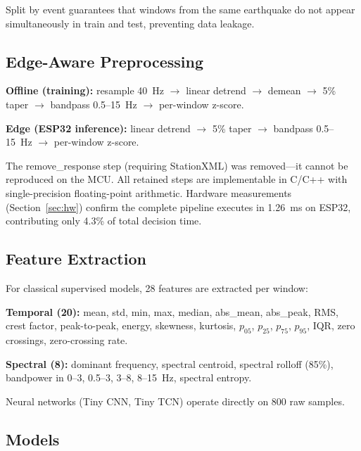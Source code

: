 \documentclass[conference]{IEEEtran}
\def\texttt#1{#1}%
\begin{document}
Split by event guarantees that windows from the same earthquake do not
appear simultaneously in train and test, preventing data leakage.

\subsection{Edge-Aware Preprocessing}

\textbf{Offline (training):}
\texttt{resample 40~Hz $\to$ linear detrend $\to$ demean $\to$ 5\% taper
$\to$ bandpass 0.5--15~Hz $\to$ per-window z-score}.

\textbf{Edge (ESP32 inference):}
\texttt{linear detrend $\to$ 5\% taper $\to$ bandpass 0.5--15~Hz
$\to$ per-window z-score}.

The \texttt{remove\_response} step (requiring StationXML) was removed---it
cannot be reproduced on the MCU.
All retained steps are implementable in C/C++ with single-precision
floating-point arithmetic.
Hardware measurements (Section~\ref{sec:hw}) confirm the complete
pipeline executes in 1.26~ms on ESP32, contributing only 4.3\% of total
decision time.

\subsection{Feature Extraction}

For classical supervised models, 28 features are extracted per window:

\textbf{Temporal (20):} mean, std, min, max, median, abs\_mean, abs\_peak,
RMS, crest factor, peak-to-peak, energy, skewness, kurtosis, $p_{05}$,
$p_{25}$, $p_{75}$, $p_{95}$, IQR, zero crossings, zero-crossing rate.

\textbf{Spectral (8):} dominant frequency, spectral centroid,
spectral rolloff (85\%), bandpower in 0--3, 0.5--3, 3--8, 8--15~Hz,
spectral entropy.

Neural networks (Tiny CNN, Tiny TCN) operate directly on 800 raw samples.

\subsection{Models}
\end{document}
